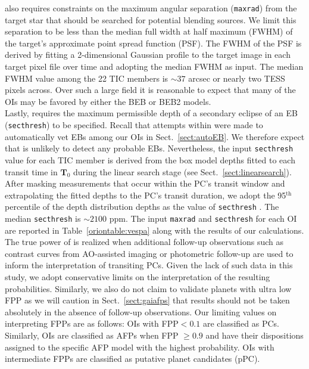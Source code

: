 \vespa{} also requires constraints on the maximum angular separation
(\texttt{maxrad}) from the target star that
should be searched for potential blending sources. We limit this separation to be less than the median
full width at half maximum (FWHM) of the target's approximate point spread function (PSF).
The FWHM of the PSF is derived by fitting a 2-dimensional Gaussian profile to the
target image in each target pixel file over time and adopting the median FWHM as \vespa{} input.
The median FWHM value among the 22 TIC members is $\sim 37$ arcsec or nearly two TESS pixels across.
Over such a large field it is reasonable to expect that many of the OIs may be favored by either the
BEB or BEB2 models. \\

Lastly, \vespa{} requires
the maximum permissible depth of a secondary eclipse of an EB (\texttt{secthresh}) to be specified.
Recall that attempts within \pipeline{} were made to automatically vet EBs among our OIs in
Sect.~\ref{sect:autoEB}.
We therefore expect that \vespa{} is unlikely to detect any probable EBs. Nevertheless, the input
\texttt{secthresh} value for each TIC member is derived from
the box model depths fitted to each transit time in $\mathbf{T}_0$ during the linear search stage
(see Sect.~\ref{sect:linearsearch}). After masking measurements that occur within the PC's
transit window and extrapolating the fitted depths to the PC's transit duration,
we adopt the 95$^{\text{th}}$ percentile of the depth distribution depths as the value of \texttt{secthresh}
\citep{crossfield18}. The median \texttt{secthresh} is $\sim 2100$ ppm. The input \texttt{maxrad} and
\texttt{secthresh} for each OI are reported in Table~\ref{oriontable:vespa} along with the results of
our \vespa{} calculations. \\



The true power of \vespa{} is realized when additional follow-up observations such as 
contrast curves from AO-assisted imaging or photometric follow-up
are used to inform the interpretation of transiting PCs.
Given the lack of such data in this study, we adopt conservative limits on the interpretation of the
resulting \vespa{} probabilities. Similarly, we also do not claim to validate planets with ultra low FPP
\citep[$<0.01$; e.g.][]{montet15,crossfield18,livingston18} as we will caution in Sect.~\ref{sect:gaiafps}
that \vespa{} results should not be taken absolutely in the absence of follow-up
observations. Our limiting values on interpreting FPPs are as follows: OIs with FPP$<0.1$
are classified as PCs. Similarly, OIs are classified as AFPs when
FPP $\geq 0.9$ and have their dispositions assigned to the specific AFP model with the highest
probability. OIs with intermediate FPPs are classified as putative planet candidates (pPC). \\

